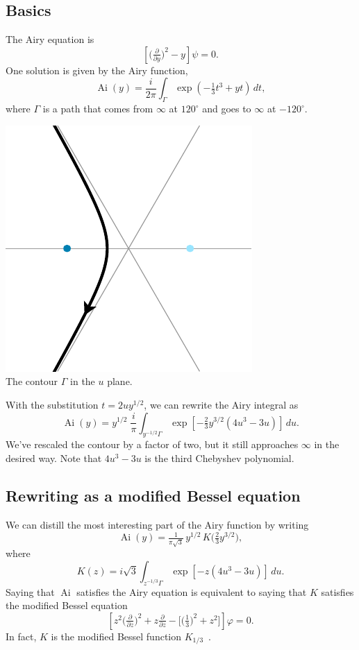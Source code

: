 \documentclass{article}
\theoremstyle{plain}
\DeclareMathOperator{\Ai}{Ai}
\begin{document}
\subsection{Basics}
The Airy equation is
\begin{equation}\label{eqn:airy}
\left[\big(\tfrac{\partial}{\partial y}\big)^2 - y\right] \psi = 0.
\end{equation}
One solution is given by the Airy function,
\[ \Ai(y) = \frac{i}{2\pi} \int_{\Gamma} \exp\left(-\tfrac{1}{3}t^3 + yt\right)\,dt, \]
where $\Gamma$ is a path that comes from $\infty$ at $120^\circ$ and goes to $\infty$ at $-120^\circ$.
\begin{center}
\includegraphics{figures/u_contour_3.pdf} \\[1em]
{\small The contour $\Gamma$ in the $u$ plane.}
\end{center}
With the substitution $t = 2uy^{1/2}$, we can rewrite the Airy integral as
\[ \Ai(y) = y^{1/2}\;\frac{i}{\pi} \int_{y^{-1/2} \Gamma} \exp\left[-\tfrac{2}{3}y^{3/2} \left(4u^3 - 3u\right)\right]\,du. \]
We've rescaled the contour by a factor of two, but it still approaches $\infty$ in the desired way. Note that $4u^3 - 3u$ is the third Chebyshev polynomial.
\subsection{Rewriting as a modified Bessel equation}
We can distill the most interesting part of the Airy function by writing
\[ \Ai(y) = \tfrac{1}{\pi\sqrt{3}}\,y^{1/2}\,K\big(\tfrac{2}{3} y^{3/2}\big), \]
where
\begin{equation}\label{integral:mod-bessel}
K(z) = i\sqrt{3} \int_{z^{-1/3}\Gamma} \exp\left[-z \left(4u^3 - 3u\right)\right]\,du.
\end{equation}
Saying that $\Ai$ satisfies the Airy equation is equivalent to saying that $K$ satisfies the modified Bessel equation
\begin{equation}\label{eqn:mod-bessel}
\left[z^2 \big(\tfrac{\partial}{\partial z}\big)^2 + z \tfrac{\partial}{\partial z} - \big[\big(\tfrac{1}{3}\big)^2 + z^2\big]\right] \varphi = 0.
\end{equation}
In fact, $K$ is the modified Bessel function $K_{1/3}$~\cite[equation~9.6.1]{dlmf}.
\end{document}
